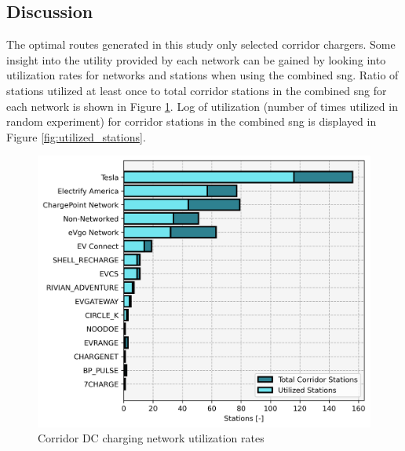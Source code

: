 \documentclass[11pt]{article}
\begin{document}
\begin{multicols}{2}
	
\section*{Discussion}

The optimal routes generated in this study only selected corridor chargers. Some insight into the utility provided by each network can be gained by looking into utilization rates for networks and stations when using the combined \gls{sng}. Ratio of stations utilized at least once to total corridor stations in the combined \gls{sng} for each network is shown in Figure \ref{fig:utilization_rates}. Log of utilization (number of times utilized in random experiment) for corridor stations in the combined \gls{sng} is displayed in Figure \ref{fig:utilized_stations}.

\begin{figure}[H]
	\centering
	\includegraphics[width = \linewidth]{figs/corridor_station_utilization.png}
	\caption{Corridor DC charging network utilization rates}
	\label{fig:utilization_rates}
\end{figure}


\end{multicols}
\end{document}
